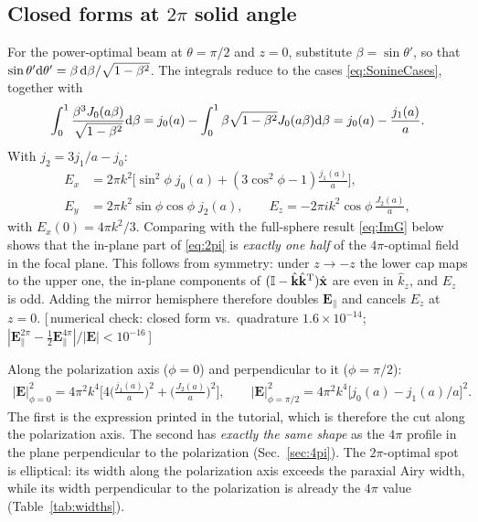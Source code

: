 \documentclass[11pt,letterpaper]{article}
\newcommand{\vect}[1]{\mathbf{#1}}
\newcommand{\Ev}{\vect{E}}
\newcommand{\kv}{\vect{k}}
\newcommand{\khat}{\hat{\kv}}
\newcommand{\xhat}{\hat{\vect{x}}}
\newcommand{\II}{\mathbb{I}}
\newcommand{\numcheck}[1]{\hfill{\small\color{green!40!black}[\,numerical check: #1\,]}}
\begin{document}
\subsection{Closed forms at \texorpdfstring{$2\pi$}{2 pi} solid angle}
For the power-optimal beam at $\theta=\pi/2$ and $z=0$, substitute $\beta=\sin\theta'$, so that $\sin\theta'{\rm d}\theta'=\beta\,{\rm d}\beta/\sqrt{1-\beta^2}$. The integrals reduce to the cases \eqref{eq:SonineCases}, together with
\begin{align*}
\int_0^1\frac{\beta^3J_0(a\beta)}{\sqrt{1-\beta^2}}{\rm d}\beta=j_0(a)-\int_0^1\beta\sqrt{1-\beta^2}J_0(a\beta){\rm d}\beta=j_0(a)-\frac{j_1(a)}{a}.
\end{align*} With $j_2=3j_1/a-j_0$:
\begin{align}
E_x &= 2\pi k^2\Big[\sin^2\!\phi\; j_0(a)+(3\cos^2\!\phi-1)\frac{j_1(a)}{a}\Big],\nonumber\\
E_y &= 2\pi k^2\sin\phi\cos\phi\; j_2(a),\qquad
E_z = -2\pi i k^2\cos\phi\,\frac{J_2(a)}{a},
\label{eq:2pi}
\end{align}
with $E_x(0)=4\pi k^2/3$. Comparing with the full-sphere result \eqref{eq:ImG} below shows that the in-plane part of \eqref{eq:2pi} is \emph{exactly one half} of the $4\pi$-optimal field in the focal plane. This follows from symmetry: under $z\to-z$ the lower cap maps to the upper one, the in-plane components of $(\II-\khat\khat^{\rm T})\xhat$ are even in $\hat k_z$, and $E_z$ is odd. Adding the mirror hemisphere therefore doubles $\Ev_\parallel$ and cancels $E_z$ at $z=0$.
\numcheck{closed form vs.\ quadrature $1.6\times10^{-14}$; $|\Ev_\parallel^{2\pi}-\tfrac12\Ev_\parallel^{4\pi}|/|\Ev|<10^{-16}$}

Along the polarization axis ($\phi=0$) and perpendicular to it ($\phi=\pi/2$):
\begin{align}
    |\Ev|^2_{\phi=0} = 4\pi^2k^4\Big[4\Big(\frac{j_1(a)}{a}\Big)^2+\Big(\frac{J_2(a)}{a}\Big)^2\Big],\qquad
    |\Ev|^2_{\phi=\pi/2} = 4\pi^2k^4\big[j_0(a)-j_1(a)/a\big]^2.
    \label{eq:2picuts}
\end{align}
The first is the expression printed in the tutorial, which is therefore the cut along the polarization axis. The second has \emph{exactly the same shape} as the $4\pi$ profile in the plane perpendicular to the polarization (Sec.~\ref{sec:4pi}). The $2\pi$-optimal spot is elliptical: its width along the polarization axis exceeds the paraxial Airy width, while its width perpendicular to the polarization is already the $4\pi$ value (Table~\ref{tab:widths}).
\end{document}
